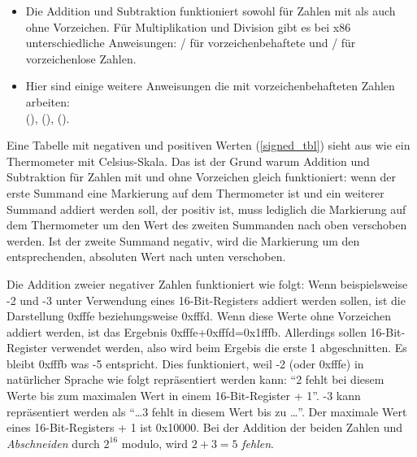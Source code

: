 \begin{itemize}
\item 
	Die Addition und Subtraktion funktioniert sowohl für Zahlen mit als auch ohne Vorzeichen.
	Für Multiplikation und Division gibt es bei x86 unterschiedliche Anweisungen:
	/ für vorzeichenbehaftete und / für vorzeichenlose Zahlen.
\item
	Hier sind einige weitere Anweisungen die mit vorzeichenbehafteten Zahlen arbeiten:\\
	 (),  (),  ().
\end{itemize}

Eine Tabelle mit negativen und positiven Werten (\ref{signed_tbl}) sieht aus wie ein Thermometer mit Celsius-Skala.
Das ist der Grund warum Addition und Subtraktion für Zahlen mit und ohne Vorzeichen gleich funktioniert:
wenn der erste Summand eine Markierung auf dem Thermometer ist und ein weiterer Summand addiert werden soll,
der positiv ist, muss lediglich die Markierung auf dem Thermometer um den Wert des zweiten Summanden nach
oben verschoben werden.
Ist der zweite Summand negativ, wird die Markierung um den entsprechenden, absoluten Wert nach unten verschoben.

Die Addition zweier negativer Zahlen funktioniert wie folgt:
Wenn beispielsweise -2 und -3 unter Verwendung eines 16-Bit-Registers addiert werden sollen,
ist die Darstellung 0xfffe beziehungsweise 0xfffd.
Wenn diese Werte ohne Vorzeichen addiert werden, ist das Ergebnis 0xfffe+0xfffd=0x1fffb.
Allerdings sollen 16-Bit-Register verwendet werden, also wird beim Ergebis die erste 1 abgeschnitten.
Es bleibt 0xfffb was -5 entspricht.
Dies funktioniert, weil -2 (oder 0xfffe) in natürlicher Sprache wie folgt repräsentiert werden kann:
``2 fehlt bei diesem Werte bis zum maximalen Wert in einem 16-Bit-Register + 1''.
-3 kann repräsentiert werden als ``\dots 3 fehlt in diesem Wert bis zu \dots''.
Der maximale Wert eines 16-Bit-Registers + 1 ist 0x10000.
Bei der Addition der beiden Zahlen und \emph{Abschneiden}  durch $2^{16}$ modulo,
wird $2+3=5$ \emph{fehlen}.




